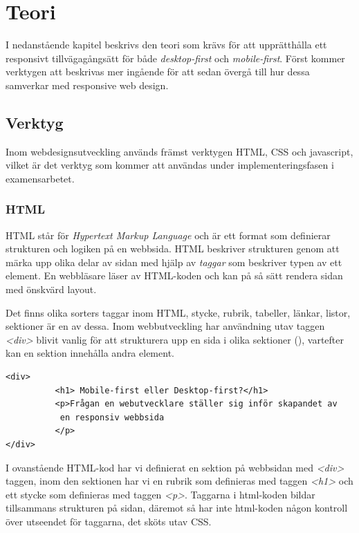 \documentclass[11pt]{article}
\begin{document}
\section{Teori}
I nedanstående kapitel beskrivs den teori som krävs för att upprätthålla ett responsivt tillvägagångsätt för både \textit{desktop-first} och \textit{mobile-first}. Först kommer verktygen att beskrivas mer ingående för att sedan övergå till hur dessa samverkar med responsive web design.

\subsection{Verktyg}

Inom webdesignsutveckling används främst verktygen HTML, CSS och javascript, vilket är det verktyg som kommer att användas under implementeringsfasen i examensarbetet.

\subsubsection{HTML}
HTML står för \textit{Hypertext Markup Language} och är ett format som definierar strukturen och logiken på en webbsida. HTML beskriver strukturen genom att märka upp olika delar av sidan med hjälp av \textit{taggar} som beskriver typen av ett element. En webbläsare läser av HTML-koden och kan på så sätt rendera sidan med önskvärd layout.

Det finns olika sorters taggar inom HTML, stycke, rubrik, tabeller, länkar, listor, sektioner är en av dessa. Inom webbutveckling har användning utav taggen \textit{<div>} blivit vanlig för att strukturera upp en sida i olika sektioner (\cite{divtable}), vartefter kan en sektion innehålla andra element.

\vspace{0.3cm}
\begin{verbatim}
<div> 
          <h1> Mobile-first eller Desktop-first?</h1>
          <p>Frågan en webutvecklare ställer sig inför skapandet av
           en responsiv webbsida
          </p>
</div>
\end{verbatim}
\vspace{0.3cm}

I ovanstående HTML-kod har vi definierat en sektion på webbsidan med \textit{<div>} taggen, inom den sektionen har vi en rubrik som definieras med taggen \textit{<h1>} och ett stycke som definieras med taggen \textit{<p>}. Taggarna i html-koden bildar tillsammans strukturen på sidan, däremot så har inte html-koden någon kontroll över utseendet för taggarna, det sköts utav CSS.  
\end{document}
